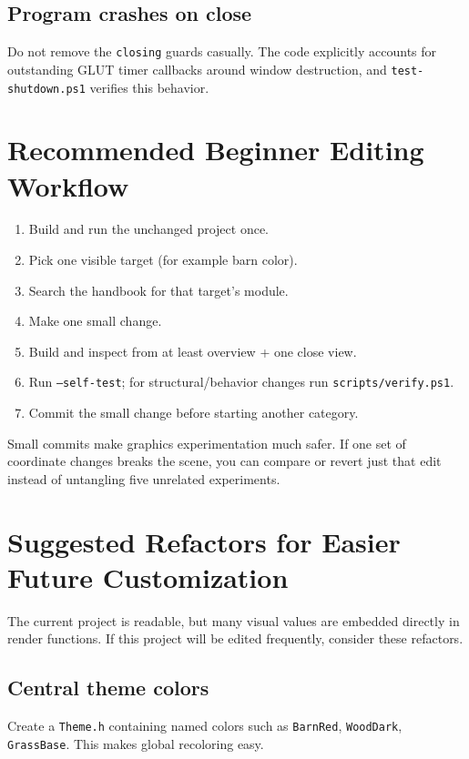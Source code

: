 \documentclass[11pt,a4paper,openany]{book}
\newcommand{\code}[1]{\texttt{#1}}
\newcommand{\file}[1]{\nolinkurl{#1}}
\begin{document}
\section{Program crashes on close}
Do not remove the \code{closing} guards casually. The code explicitly accounts for outstanding GLUT timer callbacks around window destruction, and \file{test-shutdown.ps1} verifies this behavior.

\chapter{Recommended Beginner Editing Workflow}
\begin{enumerate}
	\item Build and run the unchanged project once.
	\item Pick one visible target (for example barn color).
	\item Search the handbook for that target's module.
	\item Make one small change.
	\item Build and inspect from at least overview + one close view.
	\item Run \code{--self-test}; for structural/behavior changes run \file{scripts/verify.ps1}.
	\item Commit the small change before starting another category.
\end{enumerate}

\begin{whybox}
	Small commits make graphics experimentation much safer. If one set of coordinate changes breaks the scene, you can compare or revert just that edit instead of untangling five unrelated experiments.
\end{whybox}

\chapter{Suggested Refactors for Easier Future Customization}
The current project is readable, but many visual values are embedded directly in render functions. If this project will be edited frequently, consider these refactors.

\section{Central theme colors}
Create a \file{Theme.h} containing named colors such as \code{BarnRed}, \code{WoodDark}, \code{GrassBase}. This makes global recoloring easy.
\end{document}
